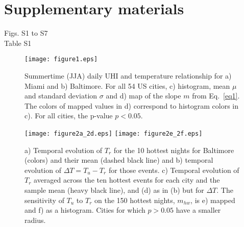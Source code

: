 \documentclass[12pt]{iopart}
\begin{document}
{\section*{Supplementary materials}
Figs. S1 to S7\\
Table S1\\




%


\begin{figure}
\texttt{[image: figure1.eps]} 
\caption{
Summertime (JJA) daily UHI and temperature relationship for a) Miami and b) Baltimore. For all 54 US cities, c) histogram, mean $\mu$ and standard deviation $\sigma$ and d) map of the slope $m$ from Eq.~\ref{eq1}.
The colors of mapped values in d) correspond to histogram colors in c). For all cities, the p-value $p < 0.05$. 
}
\label{jja}
\end{figure}


\begin{figure}
\texttt{[image: figure2a\_2d.eps]}
\texttt{[image: figure2e\_2f.eps]}
\caption{a) Temporal evolution of $T_r$ for the 10 hottest nights  for Baltimore (colors) and their mean (dashed black line) and b) temporal evolution of $\Delta T = T_u - T_r$ for those events. c) Temporal evolution of $T_r$ averaged across the ten hottest events for each city and the sample mean (heavy black line), and (d) as in (b) but for $\Delta T$.  The sensitivity of $T_u$ to $T_r$ on the 150 hottest nights, $m_{hw}$, is  e) mapped and f) as a histogram. Cities for which $p>0.05$ have a smaller radius.
}
\label{hw}
\end{figure}

}
\end{document}
